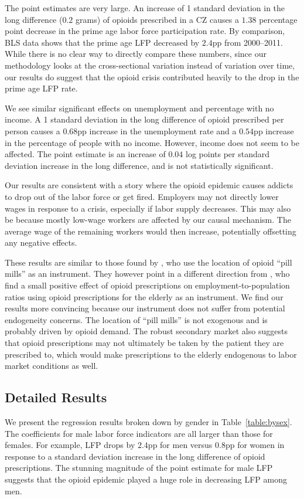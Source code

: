 \documentclass[12pt]{article}
\begin{document}
The point estimates are very large.  An increase of 1 standard deviation in the long difference ($0.2$ grams) of opioids prescribed in a CZ causes a $1.38$ percentage point decrease in the prime age labor force participation rate.  By comparison, BLS data shows that the prime age LFP decreased by $2.4$pp from 2000--2011.~  While there is no clear way to directly compare these numbers, since our methodology looks at the cross-sectional variation instead of variation over time, our results do suggest that the opioid crisis contributed heavily to the drop in the prime age LFP rate.

We see similar significant effects on unemployment and percentage with no income.  A 1 standard deviation in the long difference of opioid prescribed per person causes a $0.68$pp increase in the unemployment rate and a $0.54$pp increase in the percentage of people with no income.  However, income does not seem to be affected.  The point estimate is an increase of $0.04$ log points per standard deviation increase in the long difference, and is not statistically significant.

Our results are consistent with a story where the opioid epidemic causes addicts to drop out of the labor force or get fired.  Employers may not directly lower wages in response to a crisis, especially if labor supply decreases.  This may also be because mostly low-wage workers are affected by our causal mechanism.  The average wage of the remaining workers would then increase, potentially offsetting any negative effects.

These results are similar to those found by \textcite{harris18}, who use the location of opioid ``pill mills'' as an instrument.  They however point in a different direction from \textcite{currie18}, who find a small positive effect of opioid prescriptions on employment-to-population ratios using opioid prescriptions for the elderly as an instrument.  We find our results more convincing because our instrument does not suffer from potential endogeneity concerns.  The location of ``pill mills'' is not exogenous and is probably driven by opioid demand.  The robust secondary market also suggests that opioid prescriptions may not ultimately be taken by the patient they are prescribed to, which would make prescriptions to the elderly endogenous to labor market conditions as well.

\subsection{Detailed Results}
We present the regression results broken down by gender in Table~\ref{table:bysex}.  The coefficients for male labor force indicators are all larger than those for females.  For example, LFP drops by $2.4$pp for men versus $0.8$pp for women in response to a standard deviation increase in the long difference of opioid prescriptions.  The stunning magnitude of the point estimate for male LFP suggests that the opioid epidemic played a huge role in decreasing LFP among men.
\end{document}
